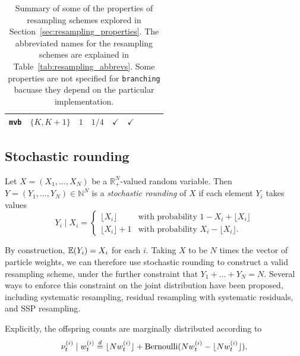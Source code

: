 \begin{landscape}
\begin{table}[ht]
\begin{tabular}{ l | c c c c c c c c }
\texttt{mvb} & $\{K, K+1\}$ & $1$ & $1/4$ & $\checkmark$ & $\checkmark$ 
        & & & \\
\hline\hline
\end{tabular}
\caption[Properties of resampling schemes]{Summary of some of the properties of resampling schemes explored in Section~\ref{sec:resampling_properties}. The abbreviated names for the resampling schemes are explained in Table~\ref{tab:resampling_abbrevs}.  Some properties are not specified for \texttt{branching} bacuase they depend on the particular implementation.}
\label{tab:resampling_properties}
\end{table} 
\end{landscape}
 
 
 

\subsection{Stochastic rounding}
\label{sec:SRs}

\begin{defn}\label{defn:stochround}
 Let $X=(X_1,\dots,X_N)$ be a $\mathbb{R}_+^N$-valued random variable. Then $Y=(Y_1,\dots,Y_N) \in \mathbb{N}^N$ is a \emph{stochastic rounding} of $X$ if each element $Y_i$ takes values
\begin{equation*}
Y_i \mid X_i =
\begin{cases}
 \lfloor X_i \rfloor & \text{with probability } 1- X_i+ \lfloor X_i \rfloor \\
  \lfloor X_i \rfloor +1 & \text{with probability } X_i- \lfloor X_i \rfloor .
\end{cases}
\end{equation*}
\end{defn}

By construction, $\mathbb{E}(Y_i) = X_i$ for each $i$. Taking $X$ to be $N$ times the vector of particle weights, we can therefore use stochastic rounding to construct a valid resampling scheme, under the further constraint that $Y_1 + \dots + Y_N = N$.
Several ways to enforce this constraint on the joint distribution have been proposed, including systematic resampling, residual resampling with systematic residuals, and SSP resampling.

Explicitly, the offspring counts are marginally distributed according to 
\begin{equation*}
\nu_t^{(i)} \mid w_t^{(i)}
\overset{d}{=} \lfloor N w_t^{(i)} \rfloor + \operatorname{Bernoulli}( Nw_t^{(i)} - \lfloor N w_t^{(i)} \rfloor ) .
\end{equation*}

